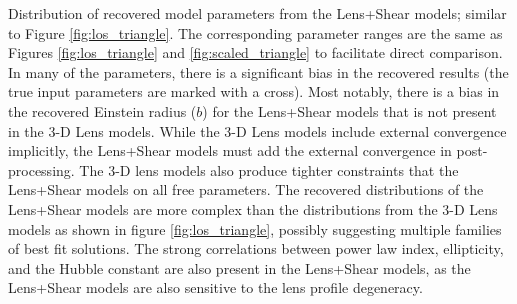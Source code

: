 \label{fig:shear_triangle} Distribution of recovered model parameters from the Lens+Shear models; similar to Figure \ref{fig:los_triangle}. The corresponding parameter ranges are the same as Figures \ref{fig:los_triangle} and \ref{fig:scaled_triangle} to facilitate direct comparison. In many of the parameters, there is a significant bias in the recovered results (the true input parameters are marked with a cross). Most notably, there is a bias in the recovered Einstein radius ($b$) for the Lens+Shear models that is not present in the 3-D Lens models. While the 3-D Lens models include external convergence implicitly, the Lens+Shear models must add the external convergence in post-processing. The 3-D lens models also produce tighter constraints that the Lens+Shear models on all free parameters. The recovered distributions of the Lens+Shear models are more complex than the distributions from the 3-D Lens models as shown in figure \ref{fig:los_triangle}, possibly suggesting multiple families of best fit solutions. The strong correlations between power law index, ellipticity, and the Hubble constant are also present in the Lens+Shear models, as the Lens+Shear models are also sensitive to the lens profile degeneracy. 